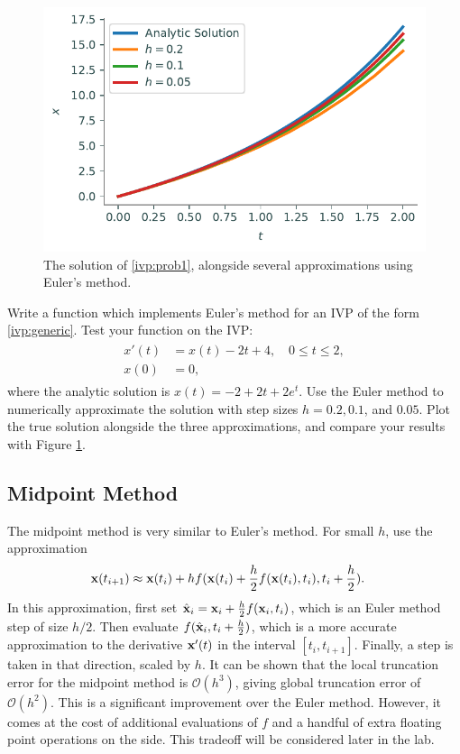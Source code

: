 \begin{figure}[H]
\centering
\includegraphics[width=150mm]{figures/euler.pdf}
\caption{The solution of \eqref{ivp:prob1}, alongside several approximations using Euler's method.}
\label{ivp:euler}
\end{figure}

\begin{problem} Write a function which implements Euler's method for an IVP of the form \eqref{ivp:generic}. Test your function on the IVP:
\begin{align}
	\begin{split}
		x' (t)&= x(t) - 2t + 4,\quad 0 \leq t \leq 2, \\
		x(0) &= 0,
	\end{split}\label{ivp:prob1}
\end{align}
where the analytic solution is $x(t) = -2+2t + 2e^t.$
Use the Euler method to numerically approximate the solution with step sizes $h = 0.2, 0.1$, and $0.05.$ Plot the true solution alongside the three approximations, and compare your results with Figure \ref{ivp:euler}.
\end{problem}



\subsection*{Midpoint Method}

The midpoint method is very similar to Euler's method.
For small $h$, use the approximation
\begin{align*}
\mathbf{x}(t_{i+1}) &\approx  \mathbf{x}(t_{i}) + h f(\mathbf{x}(t_{i})+\frac{h}{2} f(\mathbf{x}(t_i),t_i),t_{i}+\frac{h}{2}).
\end{align*}
In this approximation, first set $\hat {\mathbf{x}}_i = \mathbf{x}_i+\frac{h}{2}f(\mathbf{x}_i,t_i)$, which is an Euler method step of size $h/2$.
Then evaluate $f(\hat {\mathbf{x}}_i,t_i+\frac{h}{2})$, which is a more accurate approximation to the derivative $\mathbf{x}'(t)$ in the interval $[t_i,t_{i+1}]$.
Finally, a step is taken in that direction, scaled by $h$.
It can be shown that the local truncation error for the midpoint method is $\mathcal{O}(h^3)$, giving global truncation error of $\mathcal{O}(h^2)$.
This is a significant improvement over the Euler method.
However, it comes at the cost of additional evaluations of $f$ and a handful of extra floating point operations on the side.
This tradeoff will be considered later in the lab.

